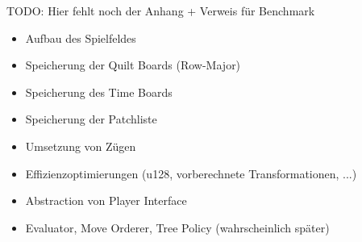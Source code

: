TODO: Hier fehlt noch der Anhang + Verweis für Benchmark

\begin{itemize}
    \item Aufbau des Spielfeldes
    \item Speicherung der Quilt Boards (Row-Major)
    \item Speicherung des Time Boards
    \item Speicherung der Patchliste
    \item Umsetzung von Zügen
    \item Effizienzoptimierungen (u128, vorberechnete Transformationen, ...)
    \item Abstraction von Player Interface
    \item Evaluator, Move Orderer, Tree Policy (wahrscheinlich später)
\end{itemize}
